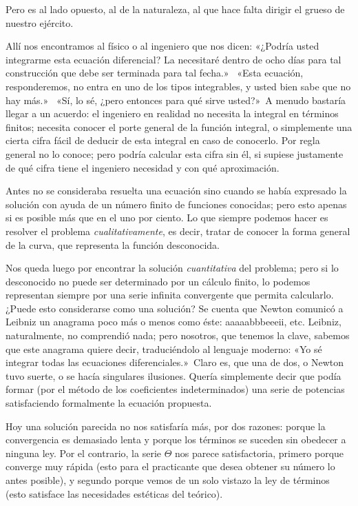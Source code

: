 \documentclass[a4paper, 12pt]{article}
\begin{document}
Pero es al lado opuesto, al de la naturaleza, al que hace falta dirigir el
grueso de nuestro ejército.

Allí nos encontramos al físico o al ingeniero que nos dicen: «¿Podría usted integrarme esta ecuación
diferencial? La necesitaré dentro de ocho días para tal construcción que debe ser terminada para tal fecha.» \ 
«Esta ecuación, responderemos,
no entra en uno de los tipos integrables, y usted bien sabe que no hay más.» \  «Sí, lo sé, ¿pero entonces
para qué sirve usted?»\   A menudo bastaría llegar a
un acuerdo: el ingeniero en realidad no necesita la integral en términos
finitos; necesita conocer el porte general de la función integral, o
simplemente una cierta cifra fácil de deducir de esta integral en caso
de conocerlo. Por regla general no lo conoce; pero podría calcular
esta cifra sin él, si supiese justamente de qué cifra tiene el
ingeniero necesidad y con qué aproximación.

Antes no se consideraba resuelta una ecuación sino cuando se había
expresado la solución con ayuda de un número finito de funciones
conocidas; pero esto apenas si es posible más que en el uno por ciento.
Lo que siempre podemos hacer es resolver el problema \textit{cualitativamente}, es
decir, tratar de conocer la forma general de la curva, que representa la
función desconocida.

Nos queda luego por encontrar la solución \textit{cuantitativa} del problema;
pero si lo desconocido no puede ser determinado por un cálculo finito,
lo podemos representan siempre por una serie infinita convergente que
permita calcularlo. ¿Puede esto considerarse como una solución? Se
cuenta que Newton comunicó a Leibniz un anagrama poco más o menos
como éste: aaaaabbbeeeii, etc. Leibniz, naturalmente, no comprendió
nada; pero nosotros, que tenemos la clave, sabemos que este anagrama quiere
decir, traduciéndolo al lenguaje moderno: «Yo sé
integrar todas las ecuaciones diferenciales.»\  Claro es, que
una de dos, o Newton tuvo suerte, o se hacía singulares ilusiones. Quería simplemente decir que podía formar (por el método de los
coeficientes indeterminados) una serie de potencias satisfaciendo
formalmente la ecuación propuesta.

Hoy una solución parecida no nos satisfaría más, por dos
razones: porque la convergencia es demasiado lenta y porque los términos
se suceden sin obedecer a ninguna ley. Por el contrario, la serie $\Theta$ nos
parece satisfactoria, primero porque converge muy rápida (esto para el
practicante que desea obtener su número lo antes posible), y segundo
porque vemos de un solo vistazo la ley de términos (esto satisface las
necesidades estéticas del teórico).
\end{document}
